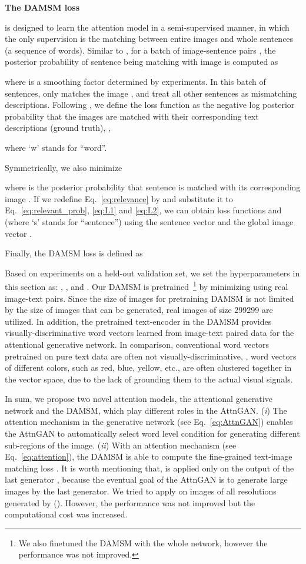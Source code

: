 \documentclass[10pt,twocolumn,letterpaper]{article}
\begin{document}
\textbf{The DAMSM loss} {
is designed to learn the attention model in a semi-supervised manner, in which the only supervision is the matching between entire images and whole sentences (a sequence of words). Similar to \cite{FangGISDDGHMPZZ15,Huang13LDS}, for a batch of image-sentence pairs , the posterior probability of sentence  being matching with image  is computed as

where  is a smoothing factor determined by experiments. In this batch of sentences, only  matches the image , and treat all other  sentences as mismatching descriptions. Following \cite{FangGISDDGHMPZZ15,Huang13LDS}, we define the loss function as the negative log posterior probability that the images are matched with their corresponding text descriptions (ground truth), \ie, 

where `w' stands for ``word''. 


Symmetrically, we also minimize 

where  is the posterior probability that sentence  is matched with its corresponding image . 
If we redefine Eq.~\eqref{eq:relevance} by  and substitute it to Eq.~\eqref{eq:relevant_prob}, \eqref{eq:L1} and \eqref{eq:L2}, we can obtain loss functions  and  (where `s' stands for ``sentence'') using the sentence vector  and the global image vector . 


Finally, the DAMSM loss is defined as 

Based on experiments on a held-out validation set, we set the hyperparameters in this section as: , ,  and . Our DAMSM is pretrained~\footnote{We also finetuned the DAMSM with the whole network, however the performance was not improved.} by minimizing  using real image-text pairs. Since the size of images for pretraining DAMSM is not limited by the size of images that can be generated, real images of size 299299 are utilized. In addition, the pretrained text-encoder in the DAMSM provides visually-discriminative word vectors learned from image-text paired data for the attentional generative network. In comparison, conventional word vectors pretrained on pure text data are often not visually-discriminative, \eg, word vectors of different colors, such as red, blue, yellow, etc., are often clustered together in the vector space, due to the lack of grounding them to the actual visual signals.
}


In sum, we propose two novel attention models, the attentional generative network and the DAMSM, which play different roles in the AttnGAN. (\textit{i}) The attention mechanism in the generative network (see Eq.~\ref{eq:AttnGAN}) enables the AttnGAN to automatically select word level condition for generating different sub-regions of the image. (\textit{ii}) With an attention mechanism (see Eq.~\ref{eq:attention}), the DAMSM is able to compute the fine-grained text-image matching loss . It is worth mentioning that,  is applied only on the output of the last generator , because the eventual goal of the AttnGAN is to generate large images by the last generator. We tried to apply  on images of all resolutions generated by ().  However, the performance was not improved but the computational cost was increased. 
\end{document}
